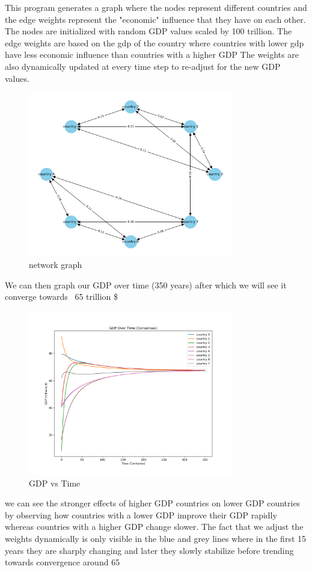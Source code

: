 \documentclass{article}
\begin{document}
This program generates a graph where the nodes represent different countries and the edge weights represent the "economic" influence that they have on each other. The nodes are initialized with random GDP values scaled by 100 trillion. The edge weights are based on the gdp of the country where countries with lower gdp have less economic influence than countries with a higher GDP
The weights are also dynamically updated at every time step to re-adjust for the new GDP values. 
\begin{figure}[htbp]
    \centering
    \includegraphics[width=0.8\textwidth]{../directed_graph.png}
    \caption{network graph}
    \label{fig: directed_graph.png}
\end{figure}
\FloatBarrier
\newpage
We can then graph our GDP over time (350 years) after which we will see it converge towards ~65 trillion \$  
\begin{figure}[htbp]
    \centering
    \includegraphics[width=0.8\textwidth]{../consensus.png}
    \caption{GDP vs Time}
    \label{fig: consensus.png}
\end{figure}
\FloatBarrier
we can see the stronger effects of higher GDP countries on lower GDP countries by observing how countries with a lower GDP improve their GDP rapidly whereas countries with a higher GDP change slower. The fact that we adjust the weights dynamically is only visible in the blue and grey lines where in the first 15 years they are sharply changing and later they slowly stabilize before trending towards convergence around 65 
\end{document}
